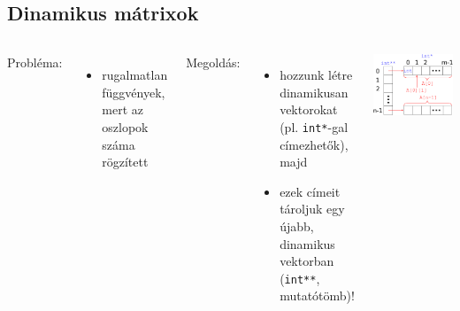 \documentclass[usenames,dvipsnames,aspectratio=169]{beamer}
\begin{document}
\begin{frame}
  \scriptsize
  \begin{exampleblock}{}
    \scriptsize
    \vspace{-.2cm}
    
    \vspace{-.2cm}
  \end{exampleblock}
\end{frame}

\subsection{Dinamikus mátrixok}
\begin{frame}
  \begin{columns}[T]
      Probléma:
      \begin{itemize}
        \item[] rugalmatlan függvények, mert az oszlopok száma rögzített
      \end{itemize}
      \vfill
      Megoldás:
      \begin{itemize}
        \item hozzunk létre dinamikusan vektorokat (pl. \texttt{int*}-gal címezhetők), majd 
        \item ezek címeit tároljuk egy újabb, dinamikus vektorban (\texttt{int**}, mutatótömb)!
      \end{itemize}
      \includegraphics[width=\textwidth]{matrix2.pdf}
  \end{columns}
\end{frame}
\end{document}

